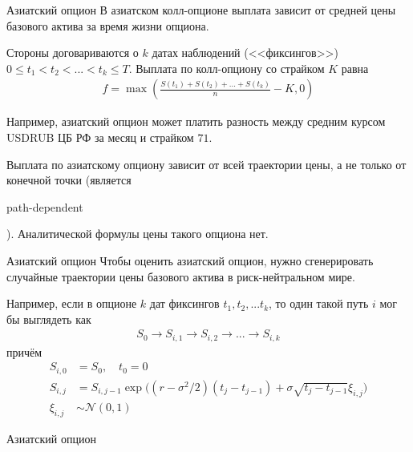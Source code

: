 \documentclass{beamer}
\newcommand{\en}[1]{\begin{otherlanguage}{english}#1\end{otherlanguage}}
\begin{document}
\begin{frame}{Азиатский опцион}
\justify
В азиатском колл-опционе выплата зависит от средней цены базового актива за время жизни опциона.

\justify
Стороны договариваются о $k$ датах наблюдений (<<фиксингов>>) $0 \le t_1 < t_2 < ... < t_k \le T$. Выплата по колл-опциону со страйком $K$ равна
\begin{align*}
f = \max\left(\frac{S(t_1) + S(t_2) + ... + S(t_k)}{n} - K, 0\right)
\end{align*}

\justify
Например, азиатский опцион может платить разность между средним курсом USDRUB ЦБ РФ за месяц и страйком $71$. 

\justify
Выплата по азиатскому опциону зависит от всей траектории цены, а не только от конечной точки (является \en{path-dependent}). Аналитической формулы цены такого опциона нет. 
\end{frame}



\begin{frame}{Азиатский опцион}
\justify
Чтобы оценить азиатский опцион, нужно сгенерировать случайные траектории цены базового актива в риск-нейтральном мире.

\justify
Например, если в опционе $k$ дат фиксингов $t_1, t_2, ... t_k$, то один такой путь $i$ мог бы выглядеть как 
\begin{align*}
S_0 \to S_{i,1} \to S_{i,2} \to ... \to S_{i,k}
\end{align*}
причём
\begin{align*}
S_{i,0} &= S_0, \quad t_0 = 0 \\
S_{i,j} &= S_{i,j-1} \exp\Big((r - \sigma^2/2)(t_j - t_{j-1}) + \sigma\sqrt{t_j - t_{j-1}}\xi_{i,j}\Big) \\
\xi_{i,j} &\sim \mathcal{N}(0, 1)
\end{align*}
\end{frame}



\newcommand{\plotStockPath}[2] {
	
	\addplot[
		mark = *,
		color = #2,
		thick
	]
	table[
		x = t,
		y = stock_price,
		col sep = comma,
		discard if not={path}{#1}
	]
	{monte_carlo_paths.csv};
}

\begin{frame}{Азиатский опцион}
\centering
{}
\end{frame}
\end{document}
